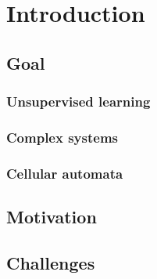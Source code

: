 \chapter{Introduction}


\section{Goal}

\subsection{Unsupervised learning}

\subsection{Complex systems}

\subsection{Cellular automata}

\section{Motivation}
\section{Challenges}
